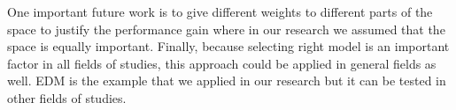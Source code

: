 One important future work is to give different weights to different parts of the space to justify the performance gain where in our research we assumed that the space is equally important.
Finally, because selecting right model is an important factor in all fields of studies, this approach could be applied in general fields as well. EDM is the example that we applied in our research but it can be tested in other fields of studies.

